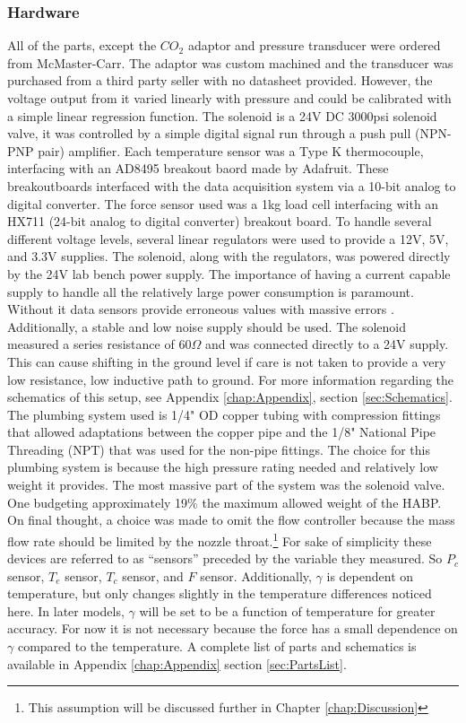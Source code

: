 \subsubsection{Hardware}
All of the parts, except the $CO_2$ adaptor and pressure transducer were ordered from McMaster-Carr. The adaptor was custom machined and the transducer was purchased from a third party seller with no datasheet provided. However, the voltage output from it varied linearly with pressure and could be calibrated with a simple linear regression function. The solenoid is a 24V DC 3000psi solenoid valve, it was controlled by a simple digital signal run through a push pull (NPN-PNP pair) amplifier. Each temperature sensor was a Type K thermocouple, interfacing with an AD8495 breakout baord made by Adafruit. These breakoutboards interfaced with the data acquisition system via a 10-bit analog to digital converter. The force sensor used was a 1kg load cell interfacing with an HX711 (24-bit analog to digital converter) breakout board. To handle several different voltage levels, several linear regulators were used to provide a 12V, 5V, and 3.3V supplies. The solenoid, along with the regulators, was powered directly by the 24V lab bench power supply. The importance of having a current capable supply to handle all the relatively large power consumption is paramount. Without it data sensors provide erroneous values with massive errors \cite{voltage}. Additionally, a stable and low noise supply should be used. The solenoid measured a series resistance of $60\Omega$ and was connected directly to a 24V supply. This can cause shifting in the ground level if care is not taken to provide a very low resistance, low inductive path to ground. For more information regarding the schematics of this setup, see Appendix \ref{chap:Appendix}, section \ref{sec:Schematics}. The plumbing system used is 1/4" OD copper tubing with compression fittings that allowed adaptations between the copper pipe and the 1/8" National Pipe Threading (NPT) that was used for the non-pipe fittings. The choice for this plumbing system is because the high pressure rating needed and relatively low weight it provides. The most massive part of the system was the solenoid valve. One budgeting approximately 19\% the maximum allowed weight of the HABP. On final thought, a choice was made to omit the flow controller because the mass flow rate should be limited by the nozzle throat.\footnote{This assumption will be discussed further in Chapter \ref{chap:Discussion}} For sake of simplicity these devices are referred to as ``sensors'' preceded by the variable they measured. So $P_c$ sensor, $T_e$ sensor, $T_c$ sensor, and $F$ sensor. Additionally, $\gamma$ is dependent on temperature, but only changes slightly in the temperature differences noticed here. In later models, $\gamma$ will be set to be a function of temperature for greater accuracy. For now it is not necessary because the force has a small dependence on $\gamma$ compared to the temperature. A complete list of parts and schematics is available in Appendix \ref{chap:Appendix} section \ref{sec:PartsList}.
